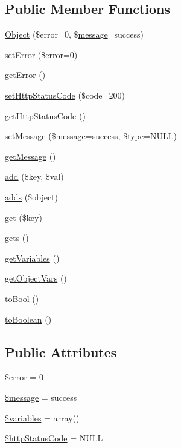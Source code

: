 \subsection*{Public Member Functions}
\begin{DoxyCompactItemize}
\item 
\hyperlink{classObject_ab5380ddfa05f4335a543a15c01bc3421}{Object} (\$error=0, \$\hyperlink{classmessage}{message}=\textquotesingle{}success\textquotesingle{})
\item 
\hyperlink{classObject_a12f7ac70214558a1774ca010865c798e}{set\+Error} (\$error=0)
\item 
\hyperlink{classObject_a2aaced460a018edd69bf17813d6c48df}{get\+Error} ()
\item 
\hyperlink{classObject_a876fabaa6dba9f8bcc53ef04eb7f3784}{set\+Http\+Status\+Code} (\$code=\textquotesingle{}200\textquotesingle{})
\item 
\hyperlink{classObject_a5cb4abc24dd01e04c24da487d476efc0}{get\+Http\+Status\+Code} ()
\item 
\hyperlink{classObject_aecb43fbc87ff3edfda11eb5d8abc814e}{set\+Message} (\$\hyperlink{classmessage}{message}=\textquotesingle{}success\textquotesingle{}, \$type=N\+U\+LL)
\item 
\hyperlink{classObject_a813487b153bfe18102ac76d8c718999f}{get\+Message} ()
\item 
\hyperlink{classObject_a4f8a7fa8794663b7625fc15c9589797b}{add} (\$key, \$val)
\item 
\hyperlink{classObject_a6dbae38facc1000561b8b230847aaca1}{adds} (\$object)
\item 
\hyperlink{classObject_ae6dff49b7ab68822bdb4ce6940c10d3f}{get} (\$key)
\item 
\hyperlink{classObject_ad6f51071a4048c1fed581748065e4d68}{gets} ()
\item 
\hyperlink{classObject_ad33c509ec041fb43c6e25f8155577925}{get\+Variables} ()
\item 
\hyperlink{classObject_afe1fe6fc005389cd616a5e9105de977a}{get\+Object\+Vars} ()
\item 
\hyperlink{classObject_a409216fd5ab386b1e78e311440113f75}{to\+Bool} ()
\item 
\hyperlink{classObject_afafb45098e163c179940c7e1ddc67fe2}{to\+Boolean} ()
\end{DoxyCompactItemize}
\subsection*{Public Attributes}
\begin{DoxyCompactItemize}
\item 
\hyperlink{classObject_a891a586df36cca119a56bb509f582858}{\$error} = 0
\item 
\hyperlink{classObject_af661550c62873d6b6e61f32d68c56973}{\$message} = \textquotesingle{}success\textquotesingle{}
\item 
\hyperlink{classObject_a153e76f6619408780cc2b50cef5100c6}{\$variables} = array()
\item 
\hyperlink{classObject_a82ad6bb41d770d91d9d10a97495669d0}{\$http\+Status\+Code} = N\+U\+LL
\end{DoxyCompactItemize}


